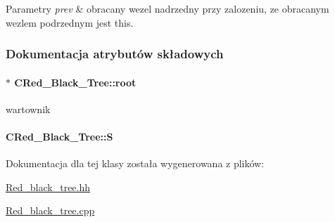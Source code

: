 \begin{DoxyParams}{Parametry}
{\em prev} & obracany wezel nadrzedny przy zalozeniu, ze obracanym wezlem podrzednym jest this. \\
\hline
\end{DoxyParams}


\subsubsection{Dokumentacja atrybutów składowych}
\hypertarget{class_c_red___black___tree_ac431b055315c6869490c71869d40e29a}{}
\paragraph[{root}]{$\ast$ C\+Red\+\_\+\+Black\+\_\+\+Tree\+::root\hspace{0.3cm}{\ttfamily [private]}}\label{class_c_red___black___tree_ac431b055315c6869490c71869d40e29a}
wartownik \hypertarget{class_c_red___black___tree_abfd1055bef2171bd6af469d0224997ae}{}
\paragraph[{S}]{ C\+Red\+\_\+\+Black\+\_\+\+Tree\+::\+S\hspace{0.3cm}{\ttfamily [private]}}\label{class_c_red___black___tree_abfd1055bef2171bd6af469d0224997ae}


Dokumentacja dla tej klasy została wygenerowana z plików\+:\begin{DoxyCompactItemize}
\item 
\hyperlink{_red__black__tree_8hh}{Red\+\_\+black\+\_\+tree.\+hh}\item 
\hyperlink{_red__black__tree_8cpp}{Red\+\_\+black\+\_\+tree.\+cpp}\end{DoxyCompactItemize}
